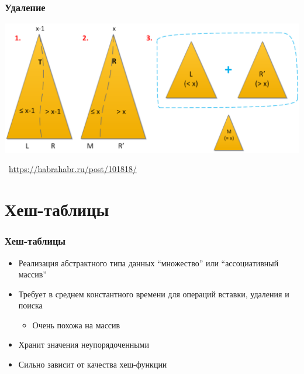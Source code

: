 \documentclass[xetex,mathserif,serif]{beamer}
\newcommand{\attribution}[1] {
	\begin{flushright}\begin{scriptsize}\textcolor{gray}{\textcopyright\, #1}\end{scriptsize}\end{flushright}
}
\begin{document}
	\begin{frame}
		\frametitle{Удаление}
		\begin{center}
			\includegraphics[width=\textwidth]{treapRemoval.png}
		\end{center}
		\attribution{\url{https://habrahabr.ru/post/101818/}}
	\end{frame}

	\section{Хеш-таблицы}

	\begin{frame}
		\frametitle{Хеш-таблицы}
		\begin{itemize}
			\item Реализация абстрактного типа данных ``множество'' или ``ассоциативный массив''
			\item Требует в среднем константного времени для операций вставки, удаления и поиска
			\begin{itemize}
				\item Очень похожа на массив
			\end{itemize}
			\item Хранит значения неупорядоченными
			\item Сильно зависит от качества хеш-функции
		\end{itemize}
	\end{frame}
\end{document}
